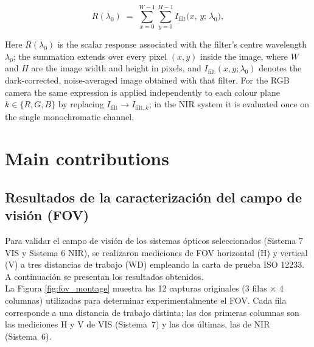 \begin{equation}
    R(\lambda_{0}) \;=\;
    \sum_{x=0}^{W-1}\sum_{y=0}^{H-1}
    I_{\text{filt}}\bigl(x,\,y;\,\lambda_{0}\bigr),
    \label{eq:spectral_response_metric_full}
\end{equation}

\noindent
Here \(R(\lambda_{0})\) is the scalar response associated with the filter’s centre wavelength \(\lambda_{0}\); the summation extends over every pixel \((x,y)\) inside the image, where $W$ and $H$ are the image width and height in pixels, and \(I_{\text{filt}}(x,y;\lambda_{0})\) denotes the dark-corrected, noise-averaged image obtained with that filter. For the RGB camera the same expression is applied independently to each colour plane \(k\in\{R,G,B\}\) by replacing \(I_{\text{filt}}\rightarrow I_{\text{filt},k}\); in the NIR system it is evaluated once on the single monochromatic channel.


\section{Main contributions}
     \subsection{Resultados de la caracterización del campo de visión (FOV)}
     \label{sec:fov_resultados}
     
     Para validar el campo de visión de los sistemas ópticos seleccionados (Sistema 7 VIS y Sistema 6 NIR), se realizaron mediciones de FOV horizontal (H) y vertical (V) a tres distancias de trabajo (\(\mathrm{WD}\)) empleando la carta de prueba ISO 12233. A continuación se presentan los resultados obtenidos.\\
     
     La Figura \ref{fig:fov_montage} muestra las 12 capturas originales (3 filas × 4 columnas) utilizadas para determinar experimentalmente el FOV. Cada fila corresponde a una distancia de trabajo distinta; las dos primeras columnas son las mediciones H y V de VIS (Sistema 7) y las dos últimas, las de NIR (Sistema 6).
     
